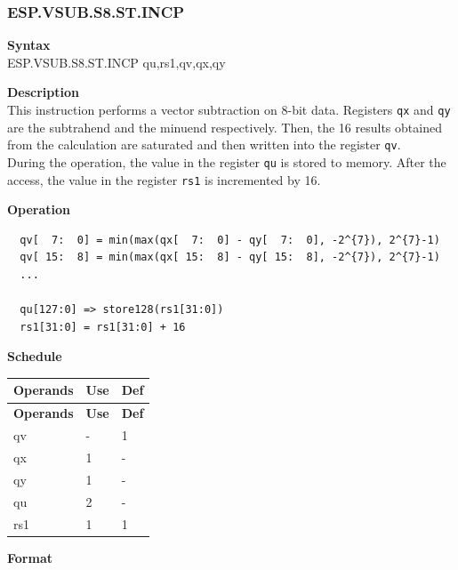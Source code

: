 \newpage
\subsubsection{ESP.VSUB.S8.ST.INCP}\label{instruction:ESPVSUBS8STINCP}
\textbf{Syntax}\\
ESP.VSUB.S8.ST.INCP qu,rs1,qv,qx,qy

\textbf{Description}\\
This instruction performs a vector subtraction on 8-bit data. Registers \lstinline{qx} and \lstinline{qy} are the subtrahend and the minuend respectively. Then, the 16 results obtained from the calculation are saturated and then written into the register \lstinline{qv}. \\ During the operation, the value in the register \lstinline{qu} is stored to memory. After the access, the value in the register \lstinline{rs1} is incremented by 16.

\textbf{Operation}\\
\begin{lstlisting}
  qv[  7:  0] = min(max(qx[  7:  0] - qy[  7:  0], -2^{7}), 2^{7}-1)
  qv[ 15:  8] = min(max(qx[ 15:  8] - qy[ 15:  8], -2^{7}), 2^{7}-1)
  ...

  qu[127:0] => store128(rs1[31:0])
  rs1[31:0] = rs1[31:0] + 16
\end{lstlisting}


\textbf{Schedule}\\
\begin{longtable}[c]{|l|l|l|}
    \hline
    \rowcolor{lightgray}
    \textbf{Operands} & \textbf{Use} & \textbf{Def} \\\hline
    \endfirsthead
    \hline
    \rowcolor{lightgray}
     \textbf{Operands} & \textbf{Use} & \textbf{Def} \\\hline
    \endhead
    \hline
    \endfoot

  qv & - & 1 \\\hline
    qx & 1 & - \\\hline
    qy & 1 & - \\\hline
    qu & 2 & - \\\hline
    rs1 & 1 & 1

\end{longtable}

\textbf{Format}\\


